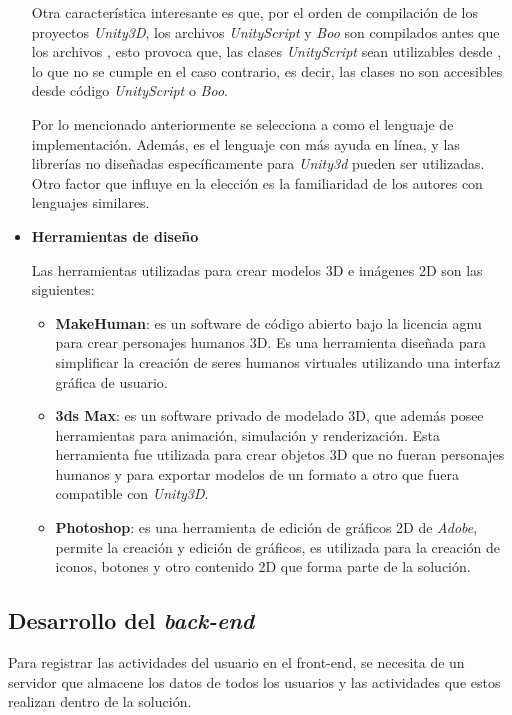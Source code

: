 \begin{itemize}
Otra característica interesante es que, por el orden de compilación de los
proyectos \textit{Unity3D}, los archivos \textit{UnityScript} y \textit{Boo} son
compilados antes que los archivos \cs{}, esto provoca que, las clases
\textit{UnityScript} sean utilizables desde \cs{}, lo que no se cumple en el
caso contrario, es decir, las clases \cs{} no son accesibles desde código
\textit{UnityScript} o \textit{Boo}.

Por lo mencionado anteriormente se selecciona a \cs{} como el lenguaje de
implementación. Además, es el lenguaje con más ayuda en línea, y las
librerías no diseñadas específicamente para \textit{Unity3d} pueden ser
utilizadas. Otro factor que influye en la elección es la familiaridad de los
autores con lenguajes similares. 

\item \textbf{Herramientas de diseño}

Las herramientas utilizadas para crear modelos 3D e imágenes 2D son las siguientes:

\begin{itemize}
\item \textbf{MakeHuman}: es un software de código abierto bajo la licencia
    \Gls{agnu} para crear personajes humanos 3D. Es una herramienta diseñada
    para simplificar la creación de seres humanos virtuales utilizando una
    interfaz gráfica de usuario\cite{makehuman}. 
\item \textbf{3ds Max}: es un software privado de modelado 3D, que además posee
    herramientas para animación, simulación y renderización. Esta herramienta
    fue utilizada para crear objetos 3D que no fueran personajes humanos y para
    exportar modelos de un formato a otro que fuera compatible con
    \textit{Unity3D}\cite{3dsmax}.
\item \textbf{Photoshop}: es una herramienta de edición de gráficos 2D de
    \textit{Adobe}, permite la creación y edición de gráficos, es utilizada para
    la creación de iconos, botones y otro contenido 2D que forma parte de la
    solución.
\end{itemize}

\end{itemize}


\subsection{Desarrollo del \textit{back-end}}

Para registrar las actividades del usuario en el front-end, se necesita de un
servidor que almacene los datos de todos los usuarios y las actividades que
estos realizan dentro de la solución.

